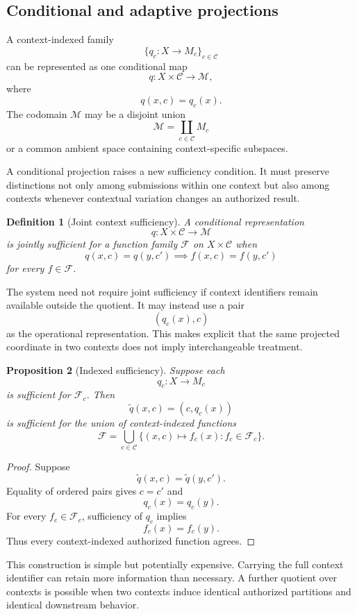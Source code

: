 \documentclass[11pt]{article}
\newtheorem{definition}{Definition}[section]
\newtheorem{proposition}[definition]{Proposition}
\theoremstyle{definition}
\newcommand{\F}{\mathcal{F}}
\begin{document}
\subsection{Conditional and adaptive projections}

A context-indexed family
\[
\{q_c:X\to M_c\}_{c\in\mathcal C}
\]
can be represented as one conditional map
\[
q:X\times\mathcal C\to\mathcal M,
\]
where
\[
q(x,c)=q_c(x).
\]
The codomain \(\mathcal M\) may be a disjoint union
\[
\mathcal M
=
\coprod_{c\in\mathcal C}M_c
\]
or a common ambient space containing context-specific subspaces.

A conditional projection raises a new sufficiency condition. It must preserve distinctions not only among submissions within one context but also among contexts whenever contextual variation changes an authorized result.

\begin{definition}[Joint context sufficiency]
A conditional representation
\[
q:X\times\mathcal C\to\mathcal M
\]
is jointly sufficient for a function family \(\F\) on \(X\times\mathcal C\) when
\[
q(x,c)=q(y,c')
\implies
f(x,c)=f(y,c')
\]
for every \(f\in\F\).
\end{definition}

The system need not require joint sufficiency if context identifiers remain available outside the quotient. It may instead use a pair
\[
(q_c(x),c)
\]
as the operational representation. This makes explicit that the same projected coordinate in two contexts does not imply interchangeable treatment.

\begin{proposition}[Indexed sufficiency]
Suppose each
\[
q_c:X\to M_c
\]
is sufficient for \(\F_c\). Then
\[
\widetilde q(x,c)
=
(c,q_c(x))
\]
is sufficient for the union of context-indexed functions
\[
\F
=
\bigcup_{c\in\mathcal C}
\{(x,c)\mapsto f_c(x):f_c\in\F_c\}.
\]
\end{proposition}

\begin{proof}
Suppose
\[
\widetilde q(x,c)
=
\widetilde q(y,c').
\]
Equality of ordered pairs gives \(c=c'\) and
\[
q_c(x)=q_c(y).
\]
For every \(f_c\in\F_c\), sufficiency of \(q_c\) implies
\[
f_c(x)=f_c(y).
\]
Thus every context-indexed authorized function agrees.
\end{proof}

This construction is simple but potentially expensive. Carrying the full context identifier can retain more information than necessary. A further quotient over contexts is possible when two contexts induce identical authorized partitions and identical downstream behavior.
\end{document}
